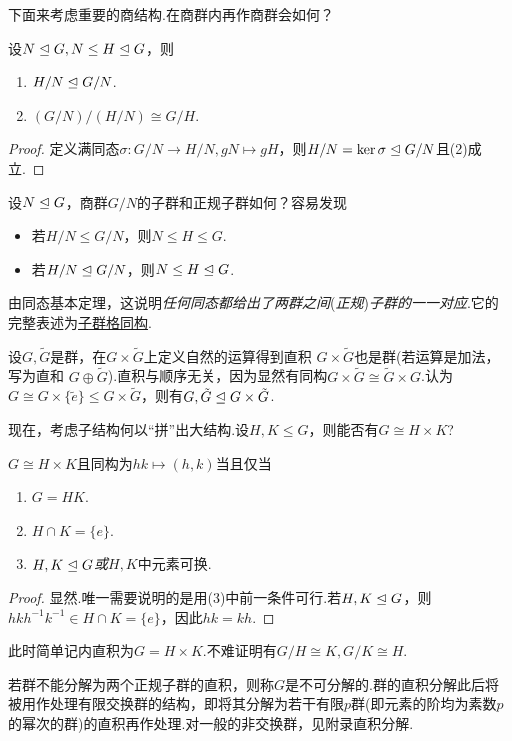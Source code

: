 下面来考虑重要的商结构.在商群内再作商群会如何？
\begin{thm}[(第二群同构)]
	设$N\trianglelefteq G,N\le H\trianglelefteq G$，则
	\begin{enumerate}
		\item $H/N\trianglelefteq G/N$.
		\item $(G/N)/(H/N)\cong G/H$.
	\end{enumerate}
\end{thm}
\begin{proof}
	定义满同态$\sigma\colon G/N\to H/N,gN\mapsto gH$，则$H/N=\ker\sigma\trianglelefteq G/N$且(2)成立.
\end{proof}

设$N\trianglelefteq G$，商群$G/N$的子群和正规子群如何？容易发现
\begin{itemize}
	\item 若$H/N\le G/N$，则$N\le H\le G$.
	\item 若$H/N\trianglelefteq G/N$，则$N\le H\trianglelefteq G$.
\end{itemize}
由同态基本定理，这说明\emph{任何同态都给出了两群之间}(\emph{正规})\emph{子群的一一对应}.它的完整表述为\hyperlink{thm:LatticeIso}{子群格同构}.

\medskip 设$G,\tilde{G}$是群，在$G\times\tilde{G}$上定义自然的运算得到{\heiti 直积} $G\times\tilde{G}$也是群(若运算是加法，写为{\heiti 直和} $G\oplus\tilde{G}$).直积与顺序无关，因为显然有同构$G\times\tilde{G}\cong\tilde{G}\times G$.认为$G\cong G\times\{\tilde{e}\}\le G\times\tilde{G}	$，则有$G,\tilde{G}\trianglelefteq G\times\tilde{G}$.

现在，考虑子结构何以“拼”出大结构.设$H,K\le G$，则能否有$G\cong H\times K$?
\begin{prop}[(内直积)]
	$G\cong H\times K$且同构为$hk\mapsto(h,k)$当且仅当
	\begin{enumerate}
		\item $G=HK$.
		\item $H\cap K=\{e\}$.
		\item $H,K\trianglelefteq G$\emph{或}$H,K$中元素可换.
	\end{enumerate}
\end{prop}
\begin{proof}
	显然.唯一需要说明的是用(3)中前一条件可行.若$H,K\trianglelefteq G$，则$hkh^{-1}k^{-1}\in H\cap K=\{e\}$，因此$hk=kh$.
\end{proof}

此时简单记内直积为$G=H\times K$.不难证明有$G/H\cong K,G/K\cong H$.

\medskip 若群不能分解为两个正规子群的直积，则称$G$是{\heiti 不可分解的}.群的直积分解此后将被用作处理有限交换群的结构，即将其分解为若干有限$p${\heiti 群}(即元素的阶均为素数$p$的幂次的群)的直积再作处理.对一般的非交换群，见附录直积分解.%

